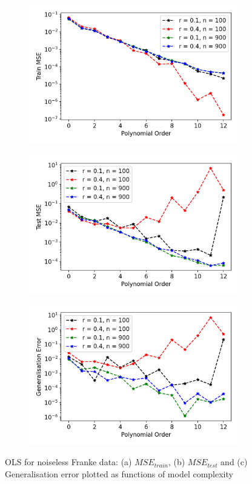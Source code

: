 \begin{figure}
\centering
\begin{subfigure}{.5\textwidth}
  \centering
  \includegraphics[width=.9\linewidth]{Images/ols2.png}
  \caption{}
  \label{fig:ols1}
\end{subfigure}%
\begin{subfigure}{.5\textwidth}
  \centering
  \includegraphics[width=.9\linewidth]{Images/ols1.png}
  \caption{}
  \label{fig:ols2}
\end{subfigure}
\begin{subfigure}{.5\textwidth}
  \centering
  \includegraphics[width=.9\linewidth]{Images/ols3.png}
  \caption{}
  \label{fig:ols3}
\end{subfigure}
\caption{OLS for noiseless Franke data: (a) $MSE_{train}$, (b) $MSE_{test}$ and (c) Generalisation error plotted as functions of model complexity}
\label{fig:OLS1}
\end{figure}

